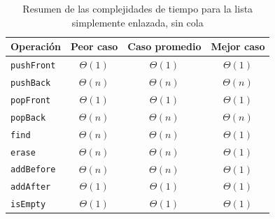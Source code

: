 \begin{table}[htbp]
  \centering{}
  \begin{tabular}{lccc}
    \toprule
    Operación & Peor caso & Caso promedio & Mejor caso \\
    \midrule
    \texttt{pushFront} & $\Theta{} (1)$ & $\Theta{} (1)$ & $\Theta{} (1)$ \\
    \texttt{pushBack} & $\Theta{} (n)$ & $\Theta{} (n)$ & $\Theta{} (n)$ \\
    \texttt{popFront} & $\Theta{} (1)$ & $\Theta{} (1)$ & $\Theta{} (1)$ \\
    \texttt{popBack} & $\Theta{} (n)$ & $\Theta{} (n)$ & $\Theta{} (n)$ \\
    \texttt{find} & $\Theta{} (n)$ & $\Theta{} (n)$ & $\Theta{} (1)$ \\
    \texttt{erase} & $\Theta{} (n)$ & $\Theta{} (n)$ & $\Theta{} (1)$ \\
    \texttt{addBefore} & $\Theta{} (n)$ & $\Theta{} (n)$ & $\Theta{} (1)$ \\
    \texttt{addAfter} & $\Theta{} (1)$ & $\Theta{} (1)$ & $\Theta{} (1)$ \\
    \texttt{isEmpty} & $\Theta{} (1)$ & $\Theta{} (1)$ & $\Theta{} (1)$ \\
    \bottomrule
  \end{tabular}
  \caption{Resumen de las complejidades de tiempo para la lista simplemente enlazada, sin cola}
  \label{tab:resumen-sin-cola}
\end{table}

